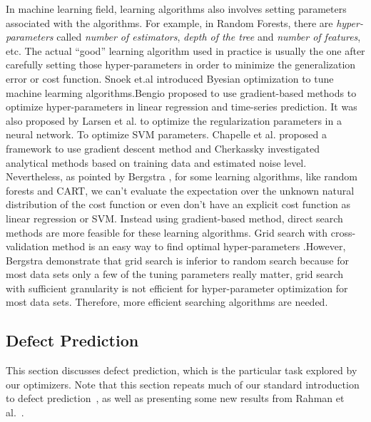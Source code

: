 In  machine learning field,  learning algorithms also involves setting parameters associated with the algorithms. For example, in Random Forests\cite{breiman2001random}, there are {\it hyper-parameters} called {\it number of estimators}, {\it depth of the tree} and {\it number of features}, etc. The actual ``good'' learning algorithm used in practice is usually the one after carefully setting those hyper-parameters in order to minimize the generalization error or cost function\cite{larsen1998adaptive,chapelle2002choosing,cherkassky2004practical,bengio2000gradient}. Snoek et.al \cite{snoek2012practical} introduced Byesian optimization to tune machine learming algorithms.Bengio \cite{bengio2000gradient} proposed to use gradient-based methods to optimize hyper-parameters in linear regression and time-series prediction. It was also proposed by Larsen et al.\cite{larsen1998adaptive} to optimize the regularization parameters in a neural network. To optimize SVM parameters. Chapelle et al. proposed a framework to use gradient descent method\cite{chapelle2002choosing} and Cherkassky investigated analytical methods based on training data and estimated noise level\cite{cherkassky2004practical}. Nevertheless, as pointed by Bergstra \cite{Bergstra2012}, for some learning algorithms, like random forests and CART, we can't evaluate the expectation over the unknown natural distribution of the cost function or even don't have an explicit cost function as linear regression or SVM. Instead using gradient-based method, direct search methods are more feasible for these learning algorithms. Grid search with cross-validation method is an easy way to find optimal hyper-parameters \cite{lerman1980fitting,hsu2003practical,jimenez2009finding,akay2009support}.However, Bergstra \cite{Bergstra2012} demonstrate that grid search is inferior to random search because for most data sets only a few of the tuning parameters really matter, grid search with  sufficient granularity is not efficient for hyper-parameter optimization for most data sets. Therefore, more efficient searching algorithms are needed.

\subsection{Defect Prediction}


This section discusses defect prediction,
which is the particular
task explored by our optimizers.
Note that this section repeats much of 
our standard introduction to defect prediction~\cite{me15:book1},
as well as presenting    some new results from Rahman et al.~\cite{rahman14:icse}. 
 



